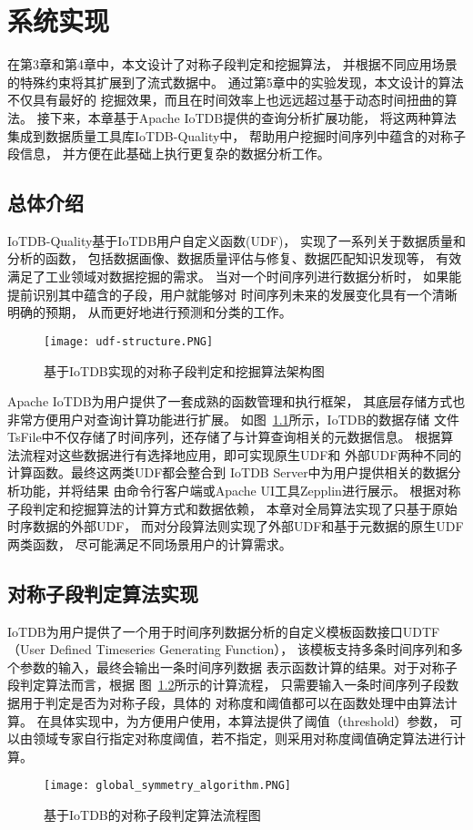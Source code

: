 
\chapter{系统实现}
在第3章和第4章中，本文设计了对称子段判定和挖掘算法，
并根据不同应用场景的特殊约束将其扩展到了流式数据中。
通过第5章中的实验发现，本文设计的算法不仅具有最好的
挖掘效果，而且在时间效率上也远远超过基于动态时间扭曲的算法。
接下来，本章基于Apache IoTDB提供的查询分析扩展功能，
将这两种算法集成到数据质量工具库IoTDB-Quality中，
帮助用户挖掘时间序列中蕴含的对称子段信息，
并方便在此基础上执行更复杂的数据分析工作。

\section{总体介绍}
IoTDB-Quality基于IoTDB用户自定义函数(UDF)，
实现了一系列关于数据质量和分析的函数，
包括数据画像、数据质量评估与修复、数据匹配知识发现等，
有效满足了工业领域对数据挖掘的需求。
当对一个时间序列进行数据分析时，
如果能提前识别其中蕴含的子段，用户就能够对
时间序列未来的发展变化具有一个清晰明确的预期，
从而更好地进行预测和分类的工作。

\begin{figure}
    \centering
    \texttt{[image: udf-structure.PNG]}
    \caption{基于IoTDB实现的对称子段判定和挖掘算法架构图}
    \label{fig:symmetry_structure}
\end{figure}

Apache IoTDB为用户提供了一套成熟的函数管理和执行框架，
其底层存储方式也非常方便用户对查询计算功能进行扩展。
如图~\ref{fig:symmetry_structure}所示，IoTDB的数据存储
文件TsFile中不仅存储了时间序列，还存储了与计算查询相关的元数据信息。
根据算法流程对这些数据进行有选择地应用，即可实现原生UDF和
外部UDF两种不同的计算函数。最终这两类UDF都会整合到
IoTDB Server中为用户提供相关的数据分析功能，并将结果
由命令行客户端或Apache UI工具Zepplin进行展示。
根据对称子段判定和挖掘算法的计算方式和数据依赖，
本章对全局算法实现了只基于原始时序数据的外部UDF，
而对分段算法则实现了外部UDF和基于元数据的原生UDF两类函数，
尽可能满足不同场景用户的计算需求。


\section{对称子段判定算法实现}
IoTDB为用户提供了一个用于时间序列数据分析的自定义模板函数接口UDTF
（User Defined Timeseries Generating Function），
该模板支持多条时间序列和多个参数的输入，最终会输出一条时间序列数据
表示函数计算的结果。对于对称子段判定算法而言，根据
图~\ref{fig:global_algorithm_process}所示的计算流程，
只需要输入一条时间序列子段数据用于判定是否为对称子段，具体的
对称度和阈值都可以在函数处理中由算法计算。
在具体实现中，为方便用户使用，本算法提供了阈值（threshold）参数，
可以由领域专家自行指定对称度阈值，若不指定，则采用对称度阈值确定算法进行计算。
\begin{figure}
    \centering
    \texttt{[image: global\_symmetry\_algorithm.PNG]}
    \caption{基于IoTDB的对称子段判定算法流程图}
    \label{fig:global_algorithm_process}
\end{figure}


